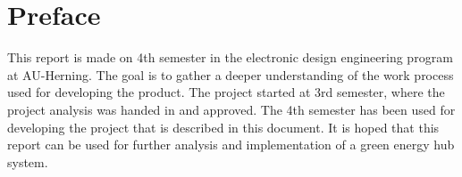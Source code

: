 \section*{Preface}
This report is made on 4th semester in the electronic design engineering program at AU-Herning. The goal is to gather a deeper understanding of the work process used for developing the product. The project started at 3rd semester, where the project analysis was handed in and approved. The 4th semester has been used for developing the project that is described in this document. 
\p
It is hoped that this report can be used for further analysis and implementation of a green energy hub system.